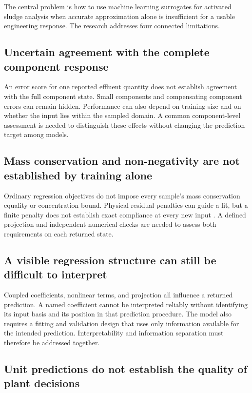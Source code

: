 The central problem is how to use machine learning surrogates for activated sludge analysis when accurate approximation alone is insufficient for a usable engineering response. The research addresses four connected limitations.

\subsection{Uncertain agreement with the complete component response}

An error score for one reported effluent quantity does not establish agreement with the full component state. Small components and compensating component errors can remain hidden. Performance can also depend on training size and on whether the input lies within the sampled domain. A common component-level assessment is needed to distinguish these effects without changing the prediction target among models.

\subsection{Mass conservation and non-negativity are not established by training alone}

Ordinary regression objectives do not impose every sample's mass conservation equality or concentration bound. Physical residual penalties can guide a fit, but a finite penalty does not establish exact compliance at every new input \citep{Raissi2019,Hansen2024}. A defined projection and independent numerical checks are needed to assess both requirements on each returned state.

\subsection{A visible regression structure can still be difficult to interpret}

Coupled coefficients, nonlinear terms, and projection all influence a returned prediction. A named coefficient cannot be interpreted reliably without identifying its input basis and its position in that prediction procedure. The model also requires a fitting and validation design that uses only information available for the intended prediction. Interpretability and information separation must therefore be addressed together.

\subsection{Unit predictions do not establish the quality of plant decisions}

